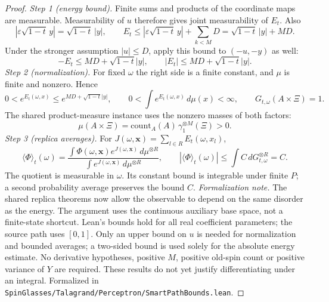 \begin{proof}
  \leanok
\emph{Step 1 (energy bound).} Finite sums and products of the coordinate maps are measurable.
Measurability of $u$ therefore gives joint measurability of $E_t$. Also
\[
 |\varepsilon\sqrt{1-t}\,y|=\sqrt{1-t}\,|y|,\qquad
 E_t\le|\varepsilon\sqrt{1-t}\,y|+\sum_{k<M}D
 =\sqrt{1-t}\,|y|+MD.
\]
Under the stronger assumption $|u|\le D$, apply this bound to $(-u,-y)$ as well:
\[
 -E_t\le MD+\sqrt{1-t}|y|,\qquad |E_t|\le MD+\sqrt{1-t}|y|.
\]
\emph{Step 2 (normalization).} For fixed $\omega$ the right side is a finite constant, and
$\mu$ is finite and nonzero. Hence
\[
 0<e^{E_t(\omega,x)}\le e^{MD+\sqrt{1-t}|y|},\qquad
 0<\int e^{E_t(\omega,x)}\,d\mu(x)<\infty,\qquad G_{t,\omega}(A\times\Xi)=1.
\]
The shared product-measure instance uses the nonzero masses of both factors:
\[
 \mu(A\times\Xi)=\mathrm{count}_A(A)\,\gamma_1^{\otimes M}(\Xi)>0.
\]
\emph{Step 3 (replica averages).} For $J(\omega,\mathbf x)=\sum_{l\in R}E_t(\omega,x_l)$,
\[
 \langle\Phi\rangle_t(\omega)=
 \frac{\int\Phi(\omega,\mathbf x)e^{J(\omega,\mathbf x)}\,d\mu^{\otimes R}}
      {\int e^{J(\omega,\mathbf x)}\,d\mu^{\otimes R}},\qquad
 |\langle\Phi\rangle_t(\omega)|\le\int C\,dG_{t,\omega}^{\otimes R}=C.
\]
The quotient is measurable in $\omega$. Its constant bound is integrable under finite $P$;
a second probability average preserves the bound $C$.
\emph{Formalization note.} The shared replica theorems now allow the observable to depend on
the same disorder as the energy. The argument uses the continuous auxiliary base space, not
a finite-state shortcut. Lean's bounds hold for all real coefficient parameters; the source
path uses $[0,1]$. Only an upper bound on $u$ is needed for normalization and bounded averages; a two-sided
bound is used solely for the absolute energy estimate. No derivative hypotheses, positive $M$,
positive old-spin count or positive variance of $Y$ are required. These results do not yet justify differentiating under an integral.
Formalized in \texttt{SpinGlasses/Talagrand/Perceptron/SmartPathBounds.lean}.
\end{proof}

